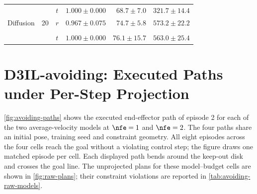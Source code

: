 \begin{table}[htpb]
\begin{tabularx}{\linewidth}{@{}L r c rrr@{}}
                     &    & \textbf{$t$} & \textbf{$1.000 \pm 0.000$} & \textbf{$68.7 \pm 7.0$} & \textbf{$321.7 \pm 14.4$} \\
    Diffusion  & 20 & $r$ & $0.967 \pm 0.075$ & $74.7 \pm 5.8$ & $573.2 \pm 22.2$ \\
                     &    &  &  &  &   \\
                     &    & $t$ & $1.000 \pm 0.000$ & $76.1 \pm 15.7$ & $563.0 \pm 25.4$ \\
    \bottomrule
  \end{tabularx}
\end{table}


\section{D3IL-avoiding: Executed Paths under Per-Step Projection}\label{app:avoiding-paths}

\autoref{fig:avoiding-paths} shows the executed end-effector path of episode 2 for each of the two
average-velocity models at $\nfe=1$ and $\nfe=2$. The four paths share an initial pose, training
seed and constraint geometry. All eight episodes across the four cells reach the goal without a
violating control step; the figure draws one matched episode per cell. Each displayed path bends
around the keep-out disk and crosses the goal line. The unprojected plans for these model--budget
cells are shown in \autoref{fig:raw-plans}; their constraint violations are reported in
\autoref{tab:avoiding-raw-models}.

